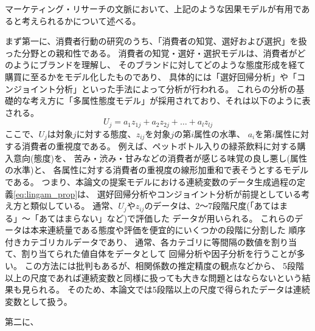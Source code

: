 マーケティング・リサーチの文脈において、上記のような因果モデルが有用であると考えられるかについて述べる。

まず第一に、消費者行動の研究のうち、「消費者の知覚、選好および選択」を扱った分野との親和性である。
消費者の知覚・選好・選択モデルは、消費者がどのようにブランドを理解し、
そのブランドに対してどのような態度形成を経て購買に至るかをモデル化したものであり、
具体的には「選好回帰分析」や「コンジョイント分析」といった手法によって分析が行われる\cite{1987-vg}。
これらの分析の基礎的な考え方に「多属性態度モデル」が採用されており、それは以下のように表される。
\begin{equation}
  U_j = a_1 z_{1j} + a_2 z_{2j} + \dots + a_l z_{lj}
\end{equation}
ここで、$U_j$は対象$j$に対する態度、$z_{ij}$を対象$j$の第$i$属性の水準、
$a_i$を第$i$属性に対する消費者の重視度である。
例えば、ペットボトル入りの緑茶飲料に対する購入意向(態度)を、
苦み・渋み・甘みなどの消費者が感じる味覚の良し悪し(属性の水準)と、
各属性に対する消費者の重視度の線形加重和で表そうとするモデルである。
つまり、本論文の提案モデルにおける連続変数のデータ生成過程の定義\ref{eq:lingam_prop}は、
選好回帰分析やコンジョイント分析が前提としている考え方と類似している。
通常、$U_j$や$z_{ij}$のデータは、2〜7段階尺度(「あてはまる」〜「あてはまらない」など)で評価した
データが用いられる\cite{1987-vg}\cite{2018-ci}。
これらのデータは本来連続量である態度や評価を便宜的にいくつかの段階に分割した
順序付きカテゴリカルデータであり、
通常、各カテゴリに等間隔の数値を割り当て、割り当てられた値自体をデータとして
回帰分析や因子分析を行うことが多い。
この方法には批判もあるが、相関係数の推定精度の観点などから、
5段階以上の尺度であれば連続変数と同様に扱っても大きな問題とはならないという結果も見られる\cite{1996-bs}。
そのため、本論文では5段階以上の尺度で得られたデータは連続変数として扱う。

第二に、
